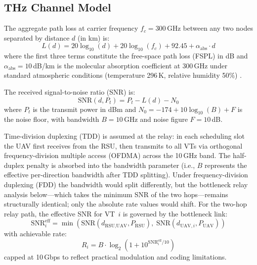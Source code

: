 \documentclass[journal]{IEEEtran}
\begin{document}
\subsection{THz Channel Model}

The aggregate path loss at carrier frequency $f_c = 300$\,GHz between any two nodes separated by distance $d$ (in km) is:
\begin{equation}
    L(d) = 20\log_{10}(d) + 20\log_{10}(f_c) + 92.45 + \alpha_\text{abs} \cdot d
    \label{eq:pathloss}
\end{equation}
where the first three terms constitute the free-space path loss (FSPL) in dB and $\alpha_\text{abs} = 10$\,dB/km is the molecular absorption coefficient at 300\,GHz under standard atmospheric conditions (temperature 296\,K, relative humidity 50\%) \cite{jornet2011, han2022}.

The received signal-to-noise ratio (SNR) is:
\begin{equation}
    \text{SNR}(d, P_t) = P_t - L(d) - N_0
    \label{eq:snr}
\end{equation}
where $P_t$ is the transmit power in dBm and $N_0 = -174 + 10\log_{10}(B) + F$ is the noise floor, with bandwidth $B = 10$\,GHz and noise figure $F = 10$\,dB.

Time-division duplexing (TDD) is assumed at the relay: in each scheduling slot the UAV first receives from the RSU, then transmits to all VTs via orthogonal frequency-division multiple access (OFDMA) across the 10\,GHz band. The half-duplex penalty is absorbed into the bandwidth parameter (i.e., $B$ represents the effective per-direction bandwidth after TDD splitting). Under frequency-division duplexing (FDD) the bandwidth would split differently, but the bottleneck relay analysis below---which takes the minimum SNR of the two hops---remains structurally identical; only the absolute rate values would shift. For the two-hop relay path, the effective SNR for VT~$i$ is governed by the bottleneck link:
\begin{equation}
    \text{SNR}_i^\text{eff} = \min\!\left(\text{SNR}(d_{\text{RSU},\text{UAV}}, P_\text{RSU}),\; \text{SNR}(d_{\text{UAV},i}, P_\text{UAV})\right)
    \label{eq:effective_snr}
\end{equation}
with achievable rate:
\begin{equation}
    R_i = B \cdot \log_2\!\left(1 + 10^{\text{SNR}_i^\text{eff}/10}\right)
    \label{eq:rate}
\end{equation}
capped at 10\,Gbps to reflect practical modulation and coding limitations.
\end{document}
